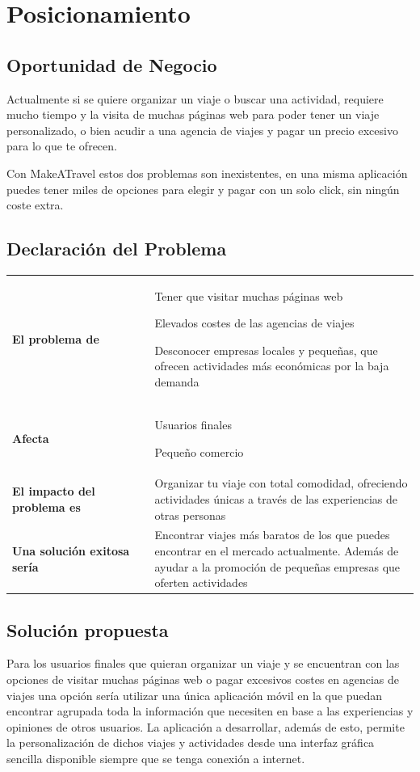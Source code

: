 \documentclass[11pt]{article}
\begin{document}
\section{Posicionamiento}
\subsection{Oportunidad de Negocio}
Actualmente si se quiere organizar un viaje o buscar una actividad,  requiere mucho tiempo y la visita de muchas páginas web para poder tener un viaje personalizado, o bien acudir a una agencia de viajes y pagar un precio excesivo para lo que te ofrecen.

Con MakeATravel estos dos problemas son inexistentes, en una misma aplicación puedes tener miles de opciones para elegir y pagar con un solo click, sin ningún coste extra.

\subsection{Declaración del Problema}

\begin{table}[H]
  \centering
  \begin{tabular}{p{0.35\linewidth}|p{0.65\linewidth}}
    \toprule
    \textbf{El problema de} & Tener que visitar muchas páginas web
    
    Elevados costes de las agencias de viajes
    
    Desconocer empresas locales y pequeñas, que ofrecen actividades más económicas por la baja demanda\\
    \textbf{Afecta} & Usuarios finales 
    
    Pequeño comercio\\
    \textbf{El impacto del problema es} & Organizar tu viaje con total comodidad, ofreciendo actividades únicas a través de las experiencias de otras personas\\
    \textbf{Una solución exitosa sería} & Encontrar viajes más baratos de los que puedes encontrar en el mercado actualmente. Además de ayudar a la promoción de pequeñas empresas que oferten actividades\\
    \bottomrule
  \end{tabular}
\end{table}

\subsection{Solución propuesta}
Para los usuarios finales que quieran organizar un viaje y se encuentran con las opciones de visitar muchas páginas web o pagar excesivos costes en agencias de viajes una opción sería utilizar una única aplicación móvil en la que puedan encontrar agrupada toda la información que necesiten en base a las experiencias y opiniones de otros usuarios. La aplicación a desarrollar, además de esto, permite la personalización de dichos viajes y actividades desde una interfaz gráfica sencilla disponible siempre que se tenga conexión a internet.
\end{document}
